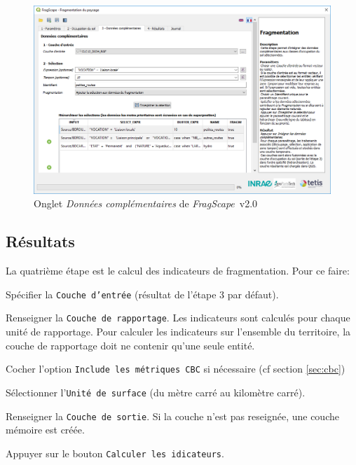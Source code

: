\documentclass[11pt]{article}
\newcommand{\source}[1]{\vspace*{-0.4cm}\caption*{\textit{Source: {#1}}}}
\newcommand{\tool}{\emph{FragScape}}
\let\tempone\itemize
\let\temptwo\enditemize
\renewenvironment{itemize}{\tempone\addtolength{\itemsep}{-0.5\baselineskip}}{\temptwo}
\begin{document}
\begin{figure}[h!]
    \centering
    \includegraphics[scale=0.6]{pictures/fragmTabFr_v2.png}
    \caption{Onglet \textit{Données complémentaires} de \tool\ v2.0}
    \label{fig:fragmTab}
\end{figure}

\subsection{Résultats}

La quatrième étape est le calcul des indicateurs de fragmentation. Pour ce faire:
\begin{itemize}
    \item Spécifier la  \texttt{Couche d'entrée} (résultat de l'étape 3 par défaut).
    \item Renseigner la \texttt{Couche de rapportage}. Les indicateurs sont calculés pour chaque unité de rapportage. Pour calculer les indicateurs sur l'ensemble du territoire, la couche de rapportage doit ne contenir qu'une seule entité.
    \item Cocher l'option \texttt{Include les métriques CBC} si nécessaire (cf section \ref{sec:cbc})
    \item Sélectionner l'\texttt{Unité de surface} (du mètre carré au kilomètre carré).
    \item Renseigner la \texttt{Couche de sortie}. Si la couche n'est pas reseignée, une couche mémoire est créée.
    \item Appuyer sur le bouton \texttt{Calculer les idicateurs}.
\end{itemize}
\end{document}
